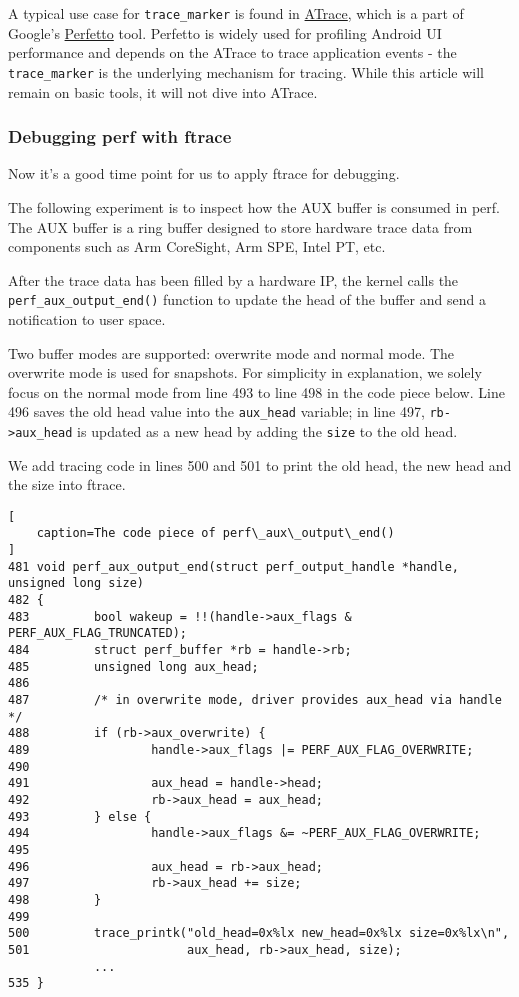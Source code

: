 \documentclass[11pt]{diazessay} %
\def\code#1{\texttt{#1}}
\begin{document}
A typical use case for \code{trace\_marker} is found in
\href{https://perfetto.dev/docs/data-sources/atrace}{ATrace}, which is a
part of Google's \href{https://ui.perfetto.dev/}{Perfetto} tool. Perfetto
is widely used for profiling Android UI performance and depends on the
ATrace to trace application events - the \code{trace\_marker} is the
underlying mechanism for tracing. While this article will remain on
basic tools, it will not dive into ATrace.

\subsubsection*{Debugging perf with ftrace}

Now it's a good time point for us to apply ftrace for debugging.

The following experiment is to inspect how the AUX buffer is consumed in perf.
The AUX buffer is a ring buffer designed to store hardware trace data from
components such as Arm CoreSight, Arm SPE, Intel PT, etc.

After the trace data has been filled by a hardware IP, the kernel calls the
\code{perf\_aux\_output\_end()} function to update the head of the buffer and
send a notification to user space.

Two buffer modes are supported: overwrite mode and normal mode. The overwrite
mode is used for snapshots. For simplicity in explanation, we solely focus on
the normal mode from line 493 to line 498 in the code piece below.
Line 496 saves the old head value into the \code{aux\_head} variable; in line
497, \code{rb->aux\_head} is updated as a new head by adding the \code{size}
to the old head.

We add tracing code in lines 500 and 501 to print the old head, the new head
and the size into ftrace.

\begin{lstlisting}[
	caption=The code piece of perf\_aux\_output\_end()
]
481 void perf_aux_output_end(struct perf_output_handle *handle, unsigned long size)
482 {
483         bool wakeup = !!(handle->aux_flags & PERF_AUX_FLAG_TRUNCATED);
484         struct perf_buffer *rb = handle->rb;
485         unsigned long aux_head;
486 
487         /* in overwrite mode, driver provides aux_head via handle */
488         if (rb->aux_overwrite) {
489                 handle->aux_flags |= PERF_AUX_FLAG_OVERWRITE;
490 
491                 aux_head = handle->head;
492                 rb->aux_head = aux_head;
493         } else {
494                 handle->aux_flags &= ~PERF_AUX_FLAG_OVERWRITE;
495 
496                 aux_head = rb->aux_head;
497                 rb->aux_head += size;
498         }
499 
500         trace_printk("old_head=0x%lx new_head=0x%lx size=0x%lx\n",
501                      aux_head, rb->aux_head, size);
            ...
535 }
\end{lstlisting}
\end{document}
